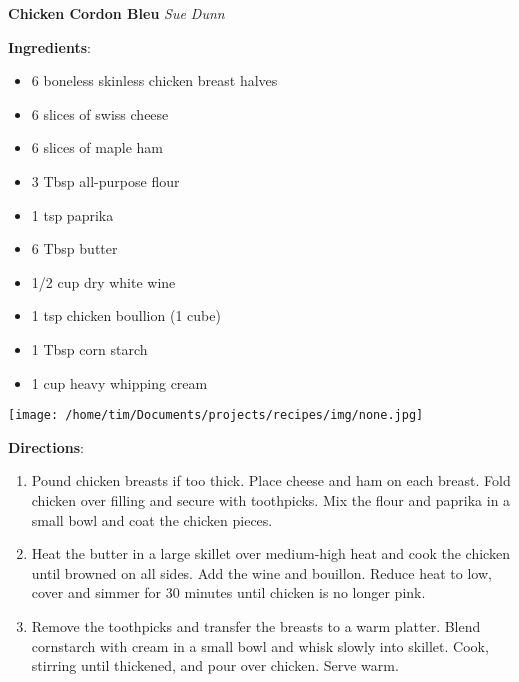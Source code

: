 \documentclass[11pt, twoside, openany]{book}
\begin{document}
\noindent\begin{minipage}[t]{\linewidth}%
{\Large\textbf{Chicken Cordon Bleu}} \label{chicken-cordon-bleu}\hfill\textit{Sue Dunn}\\
\noindent\begin{minipage}[t]{0.78\linewidth}%
\textbf{Ingredients}:\vspace{-3mm}
\begin{multicols}{2}
\begin{itemize}\setlength\itemsep{-1mm}
\item 6 boneless skinless chicken breast halves
\item 6 slices of swiss cheese
\item 6 slices of maple ham
\item 3 Tbsp all-purpose flour
\item 1 tsp paprika
\item 6 Tbsp butter
\item 1/2 cup dry white wine
\item 1 tsp chicken boullion (1 cube)
\item 1 Tbsp corn starch
\item 1 cup heavy whipping cream
\end{itemize}
\end{multicols}
\end{minipage}
\noindent\begin{minipage}[t]{0.18\linewidth}
\centering \strut\vspace*{-\baselineskip}\newline
\texttt{[image: /home/tim/Documents/projects/recipes/img/none.jpg]}\\
\end{minipage}\vspace{3mm}
\textbf{Directions}:
\vspace{-3mm}\begin{enumerate}\setlength\itemsep{-1mm}
\item Pound chicken breasts if too thick. Place cheese and ham on each breast. Fold chicken over filling and secure with toothpicks. Mix the flour and paprika in a small bowl and coat the chicken pieces.
\item Heat the butter in a large skillet over medium-high heat and cook the chicken until browned on all sides. Add the wine and bouillon. Reduce heat to low, cover and simmer for 30 minutes until chicken is no longer pink.
\item Remove the toothpicks and transfer the breasts to a warm platter. Blend cornstarch with cream in a small bowl and whisk slowly into skillet. Cook, stirring until thickened, and pour over chicken. Serve warm. 
\end{enumerate}
\end{minipage}\vspace{8mm}
\end{document}
